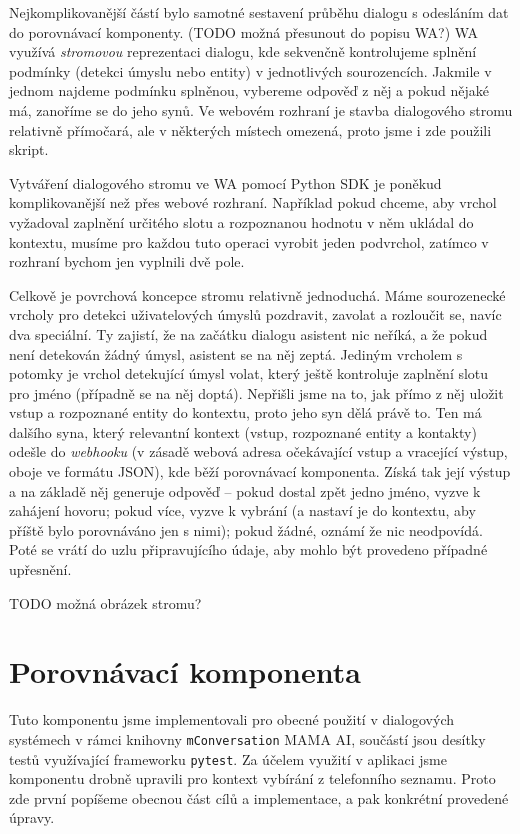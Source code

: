 Nejkomplikovanější částí bylo samotné sestavení průběhu dialogu s odesláním
dat do porovnávací komponenty. (TODO možná přesunout do popisu WA?) WA využívá
\textit{stromovou} reprezentaci dialogu,
kde sekvenčně kontrolujeme splnění podmínky (detekci úmyslu nebo entity) v
jednotlivých sourozencích. Jakmile v jednom najdeme podmínku splněnou, vybereme
odpověď z něj a pokud nějaké má, zanoříme se do jeho synů. Ve webovém rozhraní je
stavba dialogového stromu relativně přímočará, ale v některých místech omezená,
proto jsme i zde použili skript.

Vytváření dialogového stromu ve WA pomocí Python SDK je poněkud komplikovanější
než přes webové rozhraní. Například pokud chceme, aby vrchol vyžadoval zaplnění
určitého slotu a rozpoznanou hodnotu v něm ukládal do kontextu, musíme pro
každou tuto operaci vyrobit jeden podvrchol, zatímco v rozhraní bychom jen
vyplnili dvě pole.

Celkově je povrchová koncepce stromu relativně jednoduchá. Máme sourozenecké
vrcholy pro detekci uživatelových úmyslů pozdravit, zavolat a rozloučit se, navíc
dva speciální. Ty zajistí, že na začátku dialogu asistent nic neříká, a že
pokud není detekován žádný úmysl, asistent se na něj zeptá. Jediným vrcholem
s potomky je vrchol detekující úmysl volat, který ještě kontroluje zaplnění slotu
pro jméno (případně se na něj doptá). Nepřišli jsme na to, jak přímo z něj
uložit vstup a rozpoznané entity do kontextu, proto jeho syn dělá právě to. Ten
má dalšího syna, který relevantní kontext (vstup, rozpoznané entity a kontakty)
odešle do \textit{webhooku} (v zásadě webová adresa očekávající vstup a vracející
výstup, oboje ve formátu JSON), kde běží porovnávací komponenta. Získá tak její
výstup a na základě něj generuje odpověď -- pokud dostal zpět jedno jméno,
vyzve k zahájení hovoru; pokud více, vyzve k vybrání (a nastaví je do kontextu,
aby příště bylo porovnáváno jen s nimi); pokud žádné, oznámí že nic neodpovídá.
Poté se vrátí do uzlu připravujícího údaje, aby mohlo být provedeno případné
upřesnění.

TODO možná obrázek stromu?

\section{Porovnávací komponenta}\label{matching}

Tuto komponentu jsme implementovali pro obecné použití v dialogových systémech
v rámci knihovny \texttt{mConversation} MAMA AI, součástí jsou desítky testů
využívající frameworku \texttt{pytest}. Za účelem využití v aplikaci jsme komponentu
drobně upravili pro kontext vybírání z telefonního seznamu. Proto zde první popíšeme
obecnou část cílů a implementace, a pak konkrétní provedené úpravy.

